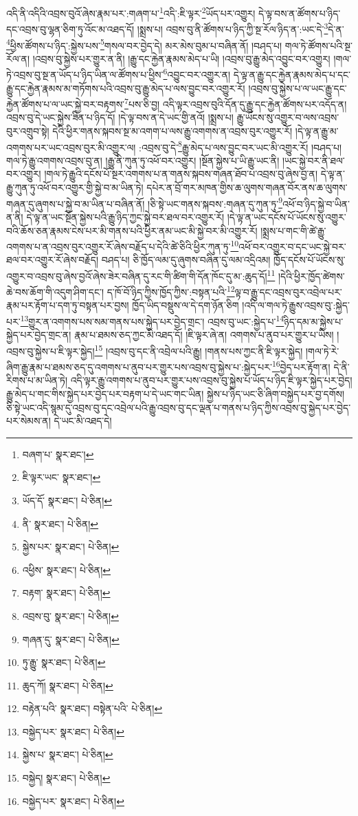 འདི་ནི་འདིའི་འབྲས་བུའོ་ཞེས་རྣམ་པར་:གཞག་པ་\footnote{བཞག་པ་  སྣར་ཐང་། }འདི་:ཇི་ལྟར་\footnote{ཇི་ལྟར་ཡང་  སྣར་ཐང་། }ཡོད་པར་འགྱུར། དེ་ལྟ་བས་ན་ཚོགས་པ་ཉིད་དང་འབྲས་བུ་ལྷན་ཅིག་ཏུ་འོང་མ་འཐད་དོ། །སྨྲས་པ། འབྲས་བུ་ནི་ཚོགས་པ་ཉིད་ཀྱི་སྔ་རོལ་ཉིད་ན་:ཡང་དེ་\footnote{ཡོད་དོ་  སྣར་ཐང་།  པེ་ཅིན། }དེ་ན་\footnote{ནི་  སྣར་ཐང་།  པེ་ཅིན། }ཕྱིས་ཚོགས་པ་ཉིད་:སྐྱེས་པས་\footnote{སྐྱེས་པར་  སྣར་ཐང་།  པེ་ཅིན། }གསལ་བར་བྱེད་དེ། མར་མེས་བུམ་པ་བཞིན་ནོ། །བཤད་པ། གལ་ཏེ་ཚོགས་པའི་སྔ་རོལ་ན། །འབྲས་བུ་སྐྱེས་པར་གྱུར་ན་ནི། །རྒྱུ་དང་རྐྱེན་རྣམས་མེད་པ་ཡི། །འབྲས་བུ་རྒྱུ་མེད་འབྱུང་བར་འགྱུར། །གལ་ཏེ་འབྲས་བུ་སྔ་ན་ཡོད་པ་ཉིད་ཡིན་ལ་ཚོགས་པ་ཕྱིས་\footnote{འཕྱིས་  སྣར་ཐང་།  པེ་ཅིན། }འབྱུང་བར་འགྱུར་ན། དེ་ལྟ་ན་རྒྱུ་དང་རྐྱེན་རྣམས་མེད་པ་དང་རྒྱུ་དང་རྐྱེན་རྣམས་མ་གཏོགས་པའི་འབྲས་བུ་རྒྱུ་མེད་པ་ལས་བྱུང་བར་འགྱུར་རོ། །འབྲས་བུ་སྐྱེས་པ་ལ་ཡང་རྒྱུ་དང་རྐྱེན་ཚོགས་པ་ལ་ཡང་སྐྱེ་བར་བརྟགས་\footnote{བརྟག་  སྣར་ཐང་།  པེ་ཅིན། }པས་ཅི་བྱ། འདི་ལྟར་འབྲས་བུའི་དོན་དུ་རྒྱུ་དང་རྐྱེན་ཚོགས་པར་འདོད་ན། འབྲས་བུ་དེ་ཡང་སྐྱེས་ཟིན་པ་ཉིད་དོ། །དེ་ལྟ་བས་ན་དེ་ཡང་གྱི་ནའོ། །སྨྲས་པ། རྒྱུ་ཡོངས་སུ་འགྱུར་བ་ལས་འབྲས་བུར་འགྲུབ་སྟེ། དེའི་ཕྱིར་གནས་སྐབས་སྔ་མ་འགག་པ་ལས་རྒྱུ་འགགས་ན་འབྲས་བུར་འགྱུར་རོ། །དེ་ལྟ་ན་རྒྱུ་མ་འགགས་པར་ཡང་འབྲས་བུར་མི་འགྱུར་ལ། :འབྲས་བུ་དེ་\footnote{འབྲས་བུ་  སྣར་ཐང་།  པེ་ཅིན། }རྒྱུ་མེད་པ་ལས་བྱུང་བར་ཡང་མི་འགྱུར་རོ། །བཤད་པ། གལ་ཏེ་རྒྱུ་འགགས་འབྲས་བུ་ན། །རྒྱུ་ནི་ཀུན་ཏུ་འཕོ་བར་འགྱུར། །སྔོན་སྐྱེས་པ་ཡི་རྒྱུ་ཡང་ནི། །ཡང་སྐྱེ་བར་ནི་ཐལ་བར་འགྱུར། །གལ་ཏེ་རྒྱུའི་དངོས་པོ་སྔར་འགགས་པ་ན་གནས་སྐབས་གཞན་ཐོབ་པ་འབྲས་བུ་ཞེས་བྱ་ན། དེ་ལྟ་ན་རྒྱུ་ཀུན་ཏུ་འཕོ་བར་འགྱུར་གྱི་སྐྱེ་བ་མ་ཡིན་ཏེ། དཔེར་ན་བྲོ་གར་མཁན་གྱིས་ཆ་ལུགས་གཞན་བོར་ནས་ཆ་ལུགས་གཞན་དུ་ཞུགས་པ་སྐྱེ་བ་མ་ཡིན་པ་བཞིན་ནོ། །ཅི་སྟེ་ཡང་གནས་སྐབས་:གཞན་དུ་ཀུན་ཏུ་\footnote{གཞན་དུ་  སྣར་ཐང་།  པེ་ཅིན། }འཕོ་བ་ཉིད་སྐྱེ་བ་ཡིན་ན་ནི། དེ་ལྟ་ན་ཡང་སྔོན་སྐྱེས་པའི་རྒྱུ་ཉིད་ཀྱང་སྐྱེ་བར་ཐལ་བར་འགྱུར་རོ། །དེ་ལྟ་ན་ཡང་དངོས་པོ་ཡོངས་སུ་འགྱུར་བའི་ཆོས་ཅན་རྣམས་ངེས་པར་མི་གནས་པའི་ཕྱིར་ནམ་ཡང་མི་སྐྱེ་བར་མི་འགྱུར་རོ། །སྨྲས་པ་གང་གི་ཚེ་རྒྱུ་འགགས་པ་ན་འབྲས་བུར་འགྱུར་རོ་ཞེས་བརྗོད་པ་དེའི་ཚེ་ཅིའི་ཕྱིར་ཀུན་ཏུ་\footnote{ཏུ་རྒྱུ་  སྣར་ཐང་།  པེ་ཅིན། }འཕོ་བར་འགྱུར་བ་དང་ཡང་སྐྱེ་བར་ཐལ་བར་འགྱུར་རོ་ཞེས་བརྗོད། བཤད་པ། ཅི་ཁྱོད་ལམ་དུ་ཞུགས་བཞིན་དུ་ལམ་འདྲིའམ། ཁྱོད་དངོས་པོ་ཡོངས་སུ་འགྱུར་བ་འབྲས་བུ་ཞེས་བྱའོ་ཞེས་ཟེར་བཞིན་དུ་རང་གི་ཚིག་གི་དོན་ཁོང་དུ་མ་:ཆུད་དོ།\footnote{ཆུད་ཀོ།  སྣར་ཐང་།  པེ་ཅིན། } །དེའི་ཕྱིར་ཁྱོད་ཚེགས་ཆེ་བས་ཆོག་གི་འདུག་ཤིག་དང་། ད་ཁོ་བོ་ཉིད་ཀྱིས་ཁྱོད་ཀྱིས་:བསྟན་པའི་\footnote{བརྟེན་པའི་  སྣར་ཐང་། བསྟེན་པའི་  པེ་ཅིན། }ལྟ་བ་རྒྱུ་དང་འབྲས་བུར་འབྲེལ་པར་རྣམ་པར་རྟོག་པ་དག་ཏུ་བསྟན་པར་བྱས། ཁྱོད་ཡིད་བསྡུས་ལ་དེ་དག་ཉོན་ཅིག །འདི་ལ་གལ་ཏེ་རྒྱུས་འབྲས་བུ་:སྐྱེད་པར་\footnote{བསྐྱེད་པར་  སྣར་ཐང་།  པེ་ཅིན། }གྱུར་ན་འགགས་པས་སམ་གནས་པས་སྐྱེད་པར་བྱེད་གྲང་། འབྲས་བུ་ཡང་:སྐྱེད་པ་\footnote{སྐྱེས་པ་  སྣར་ཐང་།  པེ་ཅིན། }ཉིད་དམ་མ་སྐྱེས་པ་སྐྱེད་པར་བྱེད་གྲང་ན། རྣམ་པ་ཐམས་ཅད་ཀྱང་མི་འཐད་དོ། །ཇི་ལྟར་ཞེ་ན། འགགས་པ་ནུབ་པར་གྱུར་པ་ཡིས། །འབྲས་བུ་སྐྱེས་པ་ཇི་ལྟར་སྐྱེད།\footnote{བསྐྱེད།  སྣར་ཐང་།  པེ་ཅིན། } །འབྲས་བུ་དང་ནི་འབྲེལ་པའི་རྒྱུ། །གནས་པས་ཀྱང་ནི་ཇི་ལྟར་སྐྱེད། །གལ་ཏེ་རེ་ཞིག་རྒྱུ་རྣམ་པ་ཐམས་ཅད་དུ་འགགས་པ་ནུབ་པར་གྱུར་པས་འབྲས་བུ་སྐྱེས་པ་:སྐྱེད་པར་\footnote{བསྐྱེད་པར་  སྣར་ཐང་།  པེ་ཅིན། }བྱེད་པར་རྟོག་ན། དེ་ནི་རིགས་པ་མ་ཡིན་ཏེ། འདི་ལྟར་རྒྱུ་འགགས་པ་ནུབ་པར་གྱུར་པས་འབྲས་བུ་སྐྱེས་པ་ཡོད་པ་ཉིད་ཇི་ལྟར་སྐྱེད་པར་བྱེད། རྒྱུ་མེད་པ་གང་གིས་སྐྱེད་པར་བྱེད་པར་བརྟག་པ་དེ་ཡང་གང་ཡིན། སྐྱེས་པ་ཉིད་ཡང་ཅི་ཞིག་བསྐྱེད་པར་བྱ་དགོས། ཅི་སྟེ་ཡང་འདི་སྙམ་དུ་འབྲས་བུ་དང་འབྲེལ་པའི་རྒྱུ་འབྲས་བུ་དང་ལྡན་པ་གནས་པ་ཉིད་ཀྱིས་འབྲས་བུ་སྐྱེད་པར་བྱེད་པར་སེམས་ན། དེ་ཡང་མི་འཐད་དེ། 